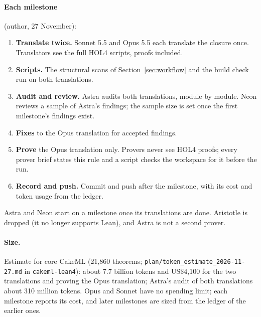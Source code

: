 \documentclass[11pt,a4paper]{article}
\newcommand{\code}[1]{\texttt{#1}}
\begin{document}
\paragraph{Each milestone} (author, 27 November):
\begin{enumerate}
\item \textbf{Translate twice.} Sonnet 5.5 and Opus 5.5 each translate the closure once. Translators see the full HOL4 scripts, proofs included.
\item \textbf{Scripts.} The structural scans of Section~\ref{sec:workflow} and the build check run on both translations.
\item \textbf{Audit and review.} Astra audits both translations, module by module. Neon reviews a sample of Astra's findings; the sample size is set once the first milestone's findings exist.
\item \textbf{Fixes} to the Opus translation for accepted findings.
\item \textbf{Prove} the Opus translation only. Provers never see HOL4 proofs; every prover brief states this rule and a script checks the workspace for it before the run.
\item \textbf{Record and push.} Commit and push after the milestone, with its cost and token usage from the ledger.
\end{enumerate}
Astra and Neon start on a milestone once its translations are done. Aristotle is dropped (it no longer supports Lean), and Astra is not a second prover.

\paragraph{Size.} Estimate for core CakeML (21{,}860 theorems; \code{plan/token\_estimate\_2026-11-27.md} in \code{cakeml-lean4}): about 7.7 billion tokens and US\$4{,}100 for the two translations and proving the Opus translation; Astra's audit of both translations about 310 million tokens. Opus and Sonnet have no spending limit; each milestone reports its cost, and later milestones are sized from the ledger of the earlier ones.
\end{document}

